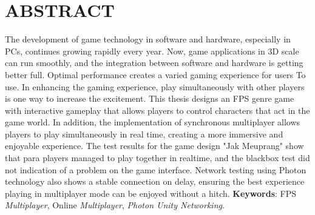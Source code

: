 \chapter*{ABSTRACT}
\noindent
The development of game technology in software and hardware, especially in PCs, continues
growing rapidly every year. Now, game applications in 3D scale can
run smoothly, and the integration between software and hardware is getting better
full. Optimal performance creates a varied gaming experience for users
To use. In enhancing the gaming experience, play simultaneously
with other players is one way to increase the excitement. This thesis designs an FPS genre game with interactive gameplay that allows players to control characters that act in the game world. In addition, the implementation of synchronous multiplayer allows players to play simultaneously in real time, creating a more immersive and enjoyable experience.
The test results for the game design "Jak Meuprang" show that para
players managed to play together in realtime, and the blackbox test did not
indication of a problem on the game interface. Network testing using
Photon technology also shows a stable connection on delay, ensuring the best experience
playing in multiplayer mode can be enjoyed without a hitch.
\newline
\noindent \textbf{Keywords}: FPS \textit{Multiplayer}, Online \textit{Multiplayer}, \textit{Photon Unity Networking}.